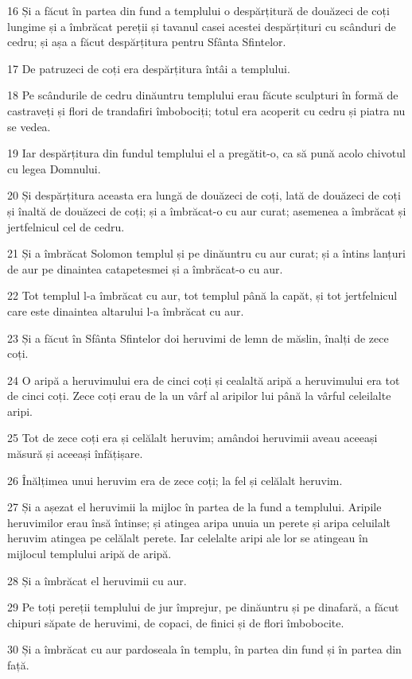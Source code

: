 \par 16 Și a făcut în partea din fund a templului o despărțitură de douăzeci de coți lungime și a îmbrăcat pereții și tavanul casei acestei despărțituri cu scânduri de cedru; și așa a făcut despărțitura pentru Sfânta Sfintelor.
\par 17 De patruzeci de coți era despărțitura întâi a templului.
\par 18 Pe scândurile de cedru dinăuntru templului erau făcute sculpturi în formă de castraveți și flori de trandafiri îmbobociți; totul era acoperit cu cedru și piatra nu se vedea.
\par 19 Iar despărțitura din fundul templului el a pregătit-o, ca să pună acolo chivotul cu legea Domnului.
\par 20 Și despărțitura aceasta era lungă de douăzeci de coți, lată de douăzeci de coți și înaltă de douăzeci de coți; și a îmbrăcat-o cu aur curat; asemenea a îmbrăcat și jertfelnicul cel de cedru.
\par 21 Și a îmbrăcat Solomon templul și pe dinăuntru cu aur curat; și a întins lanțuri de aur pe dinaintea catapetesmei și a îmbrăcat-o cu aur.
\par 22 Tot templul l-a îmbrăcat cu aur, tot templul până la capăt, și tot jertfelnicul care este dinaintea altarului l-a îmbrăcat cu aur.
\par 23 Și a făcut în Sfânta Sfintelor doi heruvimi de lemn de măslin, înalți de zece coți.
\par 24 O aripă a heruvimului era de cinci coți și cealaltă aripă a heruvimului era tot de cinci coți. Zece coți erau de la un vârf al aripilor lui până la vârful celeilalte aripi.
\par 25 Tot de zece coți era și celălalt heruvim; amândoi heruvimii aveau aceeași măsură și aceeași înfățișare.
\par 26 Înălțimea unui heruvim era de zece coți; la fel și celălalt heruvim.
\par 27 Și a așezat el heruvimii la mijloc în partea de la fund a templului. Aripile heruvimilor erau însă întinse; și atingea aripa unuia un perete și aripa celuilalt heruvim atingea pe celălalt perete. Iar celelalte aripi ale lor se atingeau în mijlocul templului aripă de aripă.
\par 28 Și a îmbrăcat el heruvimii cu aur.
\par 29 Pe toți pereții templului de jur împrejur, pe dinăuntru și pe dinafară, a făcut chipuri săpate de heruvimi, de copaci, de finici și de flori îmbobocite.
\par 30 Și a îmbrăcat cu aur pardoseala în templu, în partea din fund și în partea din față.
